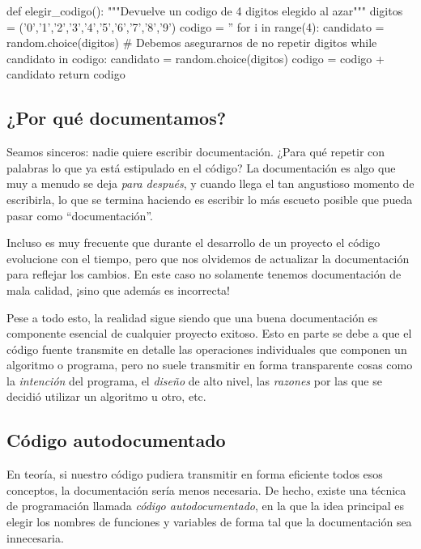 \begin{codigo-python-sn}
def elegir_codigo():
    """Devuelve un codigo de 4 digitos elegido al azar"""
    digitos = ('0','1','2','3','4','5','6','7','8','9')
    codigo = ''
    for i in range(4):
        candidato = random.choice(digitos)
        # Debemos asegurarnos de no repetir digitos
        while candidato in codigo:
            candidato = random.choice(digitos)
        codigo = codigo + candidato
    return codigo
\end{codigo-python-sn}

\subsection{¿Por qué documentamos?}

Seamos sinceros: nadie quiere escribir documentación. ¿Para qué repetir con
palabras lo que ya está estipulado en el código? La documentación es algo que
muy a menudo se deja \emph{para después}, y cuando llega el tan angustioso
momento de escribirla, lo que se termina haciendo es escribir lo más
escueto posible que pueda pasar como ``documentación''.

Incluso es muy frecuente que durante el desarrollo de un proyecto el código
evolucione con el tiempo, pero que nos olvidemos de actualizar la documentación
para reflejar los cambios. En este caso no solamente tenemos documentación de
mala calidad, ¡sino que además es incorrecta!

Pese a todo esto, la realidad sigue siendo que una buena documentación es
componente esencial de cualquier proyecto exitoso. Esto en parte se debe a que
el código fuente transmite en detalle las operaciones individuales que componen
un algoritmo o programa, pero no suele transmitir en forma transparente cosas
como la \emph{intención} del programa, el \emph{diseño} de alto nivel, las
\emph{razones} por las que se decidió utilizar un algoritmo u otro, etc.

\subsection{Código autodocumentado}

En teoría, si nuestro código pudiera transmitir en forma eficiente todos esos
conceptos, la documentación sería menos necesaria. De hecho, existe una técnica de
programación llamada \emph{código autodocumentado}, en la que la idea principal
es elegir los nombres de funciones y variables de forma tal que la
documentación sea innecesaria.

